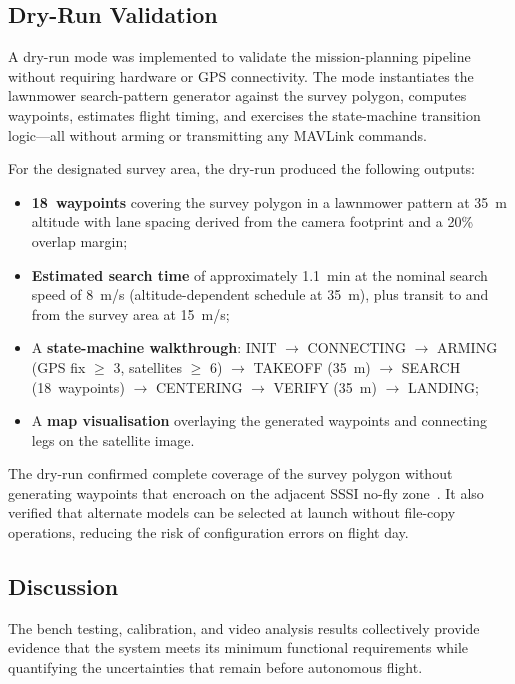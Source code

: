 \subsection{Dry-Run Validation}\label{sec:dry-run-results}

A dry-run mode was implemented to validate the mission-planning pipeline without requiring hardware or GPS connectivity. The mode instantiates the lawnmower search-pattern generator against the survey polygon, computes waypoints, estimates flight timing, and exercises the state-machine transition logic---all without arming or transmitting any MAVLink commands.

For the designated survey area, the dry-run produced the following outputs:

\begin{itemize}
    \item \textbf{18~waypoints} covering the survey polygon in a lawnmower pattern at 35~m altitude with lane spacing derived from the camera footprint and a 20\% overlap margin;
    \item \textbf{Estimated search time} of approximately 1.1~min at the nominal search speed of 8~m/s (altitude-dependent schedule at 35~m), plus transit to and from the survey area at 15~m/s;
    \item A \textbf{state-machine walkthrough}: INIT $\rightarrow$ CONNECTING $\rightarrow$ ARMING (GPS fix $\geq$ 3, satellites $\geq$ 6) $\rightarrow$ TAKEOFF (35~m) $\rightarrow$ SEARCH (18~waypoints) $\rightarrow$ CENTERING $\rightarrow$ VERIFY (35~m) $\rightarrow$ LANDING;
    \item A \textbf{map visualisation} overlaying the generated waypoints and connecting legs on the satellite image.
\end{itemize}

The dry-run confirmed complete coverage of the survey polygon without generating waypoints that encroach on the adjacent SSSI no-fly zone~\cite{wca1981}. It also verified that alternate models can be selected at launch without file-copy operations, reducing the risk of configuration errors on flight day.

\subsection{Discussion}\label{sec:results-discussion}

The bench testing, calibration, and video analysis results collectively provide evidence that the system meets its minimum functional requirements while quantifying the uncertainties that remain before autonomous flight.

